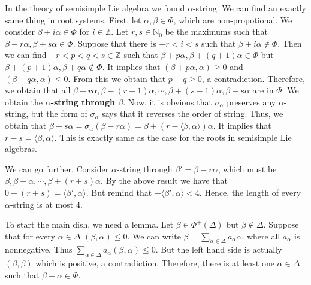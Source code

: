 \documentclass{article}
\newcommand{\NaN}{\mathbb{N}}
\newcommand{\InZ}{\mathbb{Z}}
\begin{document}
In the theory of semisimple Lie algebra we found $\alpha$-string.
We can find an exactly same thing in root systems.
First, let $\alpha, \beta \in \Phi$, which are non-propotional.
We consider $\beta + i\alpha \in \Phi$ for $i \in \InZ$.
Let $r, s \in \NaN_0$ be the maximums such that $\beta - r\alpha, \beta + s\alpha \in \Phi$.
Suppose that there is $-r < i < s$ such that $\beta + i\alpha \notin \Phi$.
Then we can find $-r < p < q < s \in \InZ$ such that $\beta + p\alpha, \beta + (q + 1)\alpha \in \Phi$ but $\beta + (p + 1)\alpha, \beta + q\alpha \notin \Phi$.
It implies that $(\beta + p\alpha, \alpha) \ge 0$ and $(\beta + q\alpha, \alpha) \le 0$.
From this we obtain that $p - q \ge 0$, a contradiction.
Therefore, we obtain that all $\beta - r\alpha, \beta - (r - 1)\alpha, \cdots, \beta + (s - 1)\alpha, \beta + s\alpha$ are in $\Phi$.
We obtain the \textbf{$\alpha$-string through $\beta$}.
Now, it is obvious that $\sigma_\alpha$ preserves any $\alpha$-string, but the form of $\sigma_\alpha$ says that it reverses the order of string.
Thus, we obtain that $\beta + s\alpha = \sigma_\alpha(\beta - r\alpha) = \beta + (r - \langle \beta, \alpha \rangle)\alpha$.
It implies that $r - s = \langle \beta, \alpha \rangle$.
This is exactly same as the case for the roots in semisimple Lie algebras.

We can go further.
Consider $\alpha$-string through $\beta' = \beta - r\alpha$, which must be $\beta, \beta + \alpha, \cdots, \beta + (r + s)\alpha$.
By the above result we have that $0 - (r + s) = \langle \beta', \alpha \rangle$.
But remind that $-\langle \beta', \alpha \rangle < 4$.
Hence, the length of every $\alpha$-string is at most 4.

To start the main dish, we need a lemma.
Let $\beta \in \Phi^+(\Delta)$ but $\beta \notin \Delta$.
Suppose that for every $\alpha \in \Delta$ $(\beta, \alpha) \le 0$.
We can write $\beta = \sum_{\alpha \in \Delta} a_\alpha \alpha$, where all $a_\alpha$ is nonnegative.
Thus $\sum_{\alpha \in \Delta} a_\alpha (\beta, \alpha) \le 0$.
But the left hand side is actually $(\beta, \beta)$ which is positive, a contradiction.
Therefore, there is at least one $\alpha \in \Delta$ such that $\beta - \alpha \in \Phi$.
\end{document}
